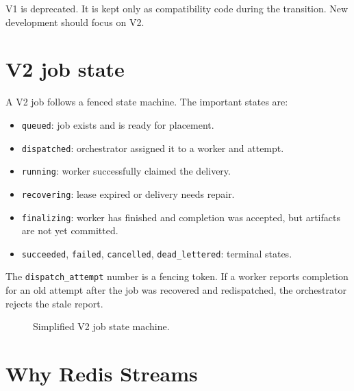 \documentclass[12pt,a4paper]{report}
\newcommand{\state}[1]{\texttt{#1}}
\newcommand{\file}[1]{\texttt{#1}}
\begin{document}
V1 is deprecated. It is kept only as compatibility code during the transition.
New development should focus on V2.

\section{V2 job state}

A V2 job follows a fenced state machine. The important states are:

\begin{itemize}[leftmargin=1.2cm]
  \item \state{queued}: job exists and is ready for placement.
  \item \state{dispatched}: orchestrator assigned it to a worker and attempt.
  \item \state{running}: worker successfully claimed the delivery.
  \item \state{recovering}: lease expired or delivery needs repair.
  \item \state{finalizing}: worker has finished and completion was accepted, but artifacts are not yet committed.
  \item \state{succeeded}, \state{failed}, \state{cancelled}, \state{dead\_lettered}: terminal states.
\end{itemize}

The \file{dispatch\_attempt} number is a fencing token. If a worker reports
completion for an old attempt after the job was recovered and redispatched, the
orchestrator rejects the stale report.

\begin{figure}[h]
\centering
{}
\caption{Simplified V2 job state machine.}
\end{figure}

\section{Why Redis Streams}
\end{document}
